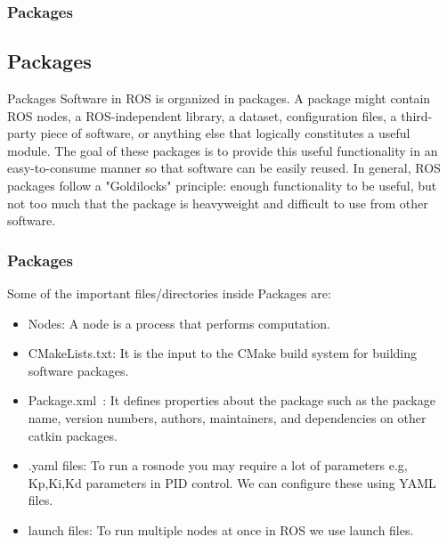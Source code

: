 \documentclass{beamer}
\begin{document}
	\begin{frame}
		\frametitle{Packages}
		\subsection{Packages}
		
		\begin{block}{Packages} 
		    Software in ROS is organized in packages. A package might contain ROS nodes, a ROS-independent library, a dataset, configuration files, a third-party piece of software, or anything else that logically constitutes a useful module. The goal of these packages is to provide this useful functionality in an easy-to-consume manner so that software can be easily reused. In general, ROS packages follow a "Goldilocks" principle: enough functionality to be useful, but not too much that the package is heavyweight and difficult to use from other software.\cite{Packages:2019}
		\end{block}

	\end{frame}




	\begin{frame}
	    \frametitle{Packages}
	    Some of the important files/directories inside Packages are: \medskip
	    
	    \begin{itemize}
	        \item Nodes: A node is a process that performs computation.
	        \item CMakeLists.txt: It is the input to the CMake build system for building software packages.
	        \item Package.xml : It defines properties about the package such as the package name, version numbers, authors, maintainers, and dependencies on other catkin packages.
	        \item .yaml files: To run a rosnode you may require a lot of parameters e.g, Kp,Ki,Kd parameters in PID control. We can configure these using YAML files. 
	        \item launch files: To run multiple nodes at once in ROS we use launch files.
	    \end{itemize}

	\end{frame}
\end{document}
